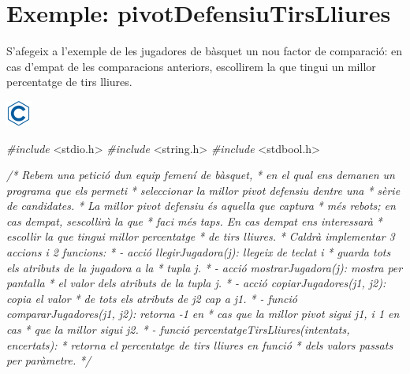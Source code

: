 \documentclass[]{book}
\newenvironment{Shaded}{\begin{snugshade}}{\end{snugshade}}
\newcommand{\CommentTok}[1]{\textcolor[rgb]{0.56,0.35,0.01}{\textit{#1}}}
\newcommand{\ImportTok}[1]{#1}
\newcommand{\PreprocessorTok}[1]{\textcolor[rgb]{0.56,0.35,0.01}{\textit{#1}}}
\begin{document}
\hypertarget{exemple-pivotdefensiutirslliures}{%
\section{Exemple: pivotDefensiuTirsLliures}\label{exemple-pivotdefensiutirslliures}}

S'afegeix a l'exemple de les jugadores de bàsquet un nou factor de comparació: en cas d'empat de les comparacions anteriors, escollirem la que tingui un millor percentatge de tirs lliures.

\includegraphics{./img/c.png}

\begin{Shaded}
\begin{Highlighting}[]
\PreprocessorTok{\#include }\ImportTok{\textless{}stdio.h\textgreater{}}
\PreprocessorTok{\#include }\ImportTok{\textless{}string.h\textgreater{}}
\PreprocessorTok{\#include }\ImportTok{\textless{}stdbool.h\textgreater{}}

\CommentTok{/* Rebem una petició d\textquotesingle{}un equip femení de bàsquet,}
\CommentTok{ * en el qual ens demanen un programa que els permeti}
\CommentTok{ * seleccionar la millor pivot defensiu d\textquotesingle{}entre una }
\CommentTok{ * sèrie de candidates.}
\CommentTok{ * La millor pivot defensiu és aquella que captura}
\CommentTok{ * més rebots; en cas d\textquotesingle{}empat, s\textquotesingle{}escollirà la que}
\CommentTok{ * faci més taps. En cas d\textquotesingle{}empat ens interessarà}
\CommentTok{ * escollir la que tingui millor percentatge}
\CommentTok{ * de tirs lliures.}
\CommentTok{ * Caldrà implementar 3 accions i 2 funcions:}
\CommentTok{ * {-} acció llegirJugadora(j): llegeix de teclat i}
\CommentTok{ *   guarda tots els atributs de la jugadora a la}
\CommentTok{ *   tupla j.}
\CommentTok{ * {-} acció mostrarJugadora(j): mostra per pantalla}
\CommentTok{ *   el valor dels atributs de la tupla j.}
\CommentTok{ * {-} acció copiarJugadores(j1, j2): copia el valor}
\CommentTok{ *   de tots els atributs de j2 cap a j1.}
\CommentTok{ * {-} funció compararJugadores(j1, j2): retorna {-}1 en }
\CommentTok{ *   cas que la millor pivot sigui j1, i 1 en cas }
\CommentTok{ *   que la millor sigui j2.}
\CommentTok{ * {-} funció percentatgeTirsLliures(intentats, encertats):}
\CommentTok{ *   retorna el percentatge de tirs lliures en funció}
\CommentTok{ *   dels valors passats per paràmetre.}
\CommentTok{ */}
 

\end{Highlighting}
\end{Shaded}
\end{document}

